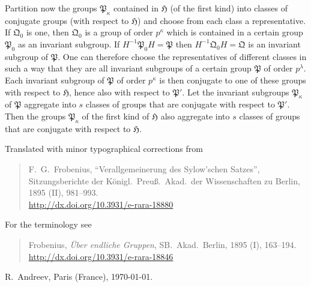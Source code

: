 \documentclass[a5paper,12pt]{article}
\let\fr\mathfrak
\newcommand{\CH}{\fr{H}}
\newcommand{\CP}{\fr{P}}
\newcommand{\CQ}{\fr{Q}}
\newcommand{\?}{{\color{blue}${}^{(?)}$}}
\begin{document}

Partition now
the groups $\CP_\kappa$
contained in $\CH$
(of the first kind)
into classes 
of conjugate groups 
(with respect to $\CH$)
and
choose 
from each class a representative.
%
%
If $\CQ_0$ is one,
then $\CQ_0$ is a group of order $p^\kappa$
which
is contained in a certain group $\CP_0$
as an invariant subgroup.
%
%
If $H^{-1} \CP_0 H = \CP$
then $H^{-1} \CQ_0 H = \CQ$
is an invariant subgroup of $\CP$.
%
%
One can therefore
choose the representatives
of different classes
in such a way
that
they are all invariant subgroups 
of a certain group $\CP$ of order $p^\lambda$.
%
%
Each invariant subgroup of $\CP$ 
of order $p^\kappa$
is then conjugate
to one of these groups
with respect to $\CH$,
hence also 
with respect to $\CP'$.
%
%
Let
the invariant subgroups $\CP_\kappa$ of $\CP$
aggregate
into $s$ classes of groups
that are conjugate 
with respect to $\CP'$.
%
%
Then the groups $\CP_\kappa$ 
of the first kind
of $\CH$
also
aggregate
into $s$ classes of groups
that are conjugate
with respect to $\CH$.



\vfill

\noindent
\begin{minipage}{\textwidth}
{\footnotesize

\noindent
Translated with minor typographical corrections from
\begin{quote}
	F.~G.~Frobenius,
	``Verallgemeinerung des Sylow'schen Satzes'',
	Sitzungsberichte der 
	K\"onigl.~Preu\ss.~Akad.~der Wissenschaften
	zu Berlin,
	1895 (II),
	981--993.
	\\
	\href{http://dx.doi.org/10.3931/e-rara-18880}{http://dx.doi.org/10.3931/e-rara-18880}
\end{quote}

\noindent
For the terminology see
\begin{quote}Frobenius,
	\emph{\"Uber endliche Gruppen},
	SB.~Akad.~Berlin,
	1895 (I),
	163--194.
	\\
	\href{http://dx.doi.org/10.3931/e-rara-18846}{http://dx.doi.org/10.3931/e-rara-18846}
\end{quote}

R.~Andreev,
Paris (France),
\today.
}
\end{minipage}




\end{document}
